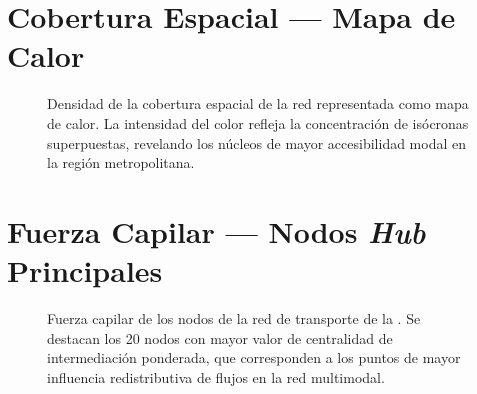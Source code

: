\section{Cobertura Espacial — Mapa de Calor}
\label{anx:mapa-cobertura-calor}

\begin{figure}[p]
  \centering
  \caption[Densidad de cobertura — mapa de calor (alta resolución)]{Densidad de la cobertura espacial de la red
    representada como mapa de calor. La intensidad del color refleja la concentración de isócronas superpuestas,
    revelando los núcleos de mayor accesibilidad modal en la región metropolitana.\DIFdelbeginFL %
\DIFdelendFL }
  \label{fig:anx-mapa-cobertura-calor}
  \DIFaddbeginFL {}
\DIFaddendFL \end{figure}

\section{Fuerza Capilar — Nodos \textit{Hub} Principales}
\label{anx:mapa-fuerza-capilar}

\begin{figure}[p]
  \centering
  \caption[Fuerza capilar: los 20 nodos \textit{hub} de mayor centralidad (alta resolución)]{Fuerza capilar de los nodos de la red
    de transporte de la \zmvm{}. Se destacan los 20 nodos con mayor valor de centralidad de intermediación ponderada,
    que corresponden a los puntos de mayor influencia redistributiva de flujos en la red multimodal.\DIFdelbeginFL %
\DIFdelendFL }
  \label{fig:anx-mapa-fuerza-capilar}
  \DIFaddbeginFL {}
\DIFaddendFL \end{figure}

